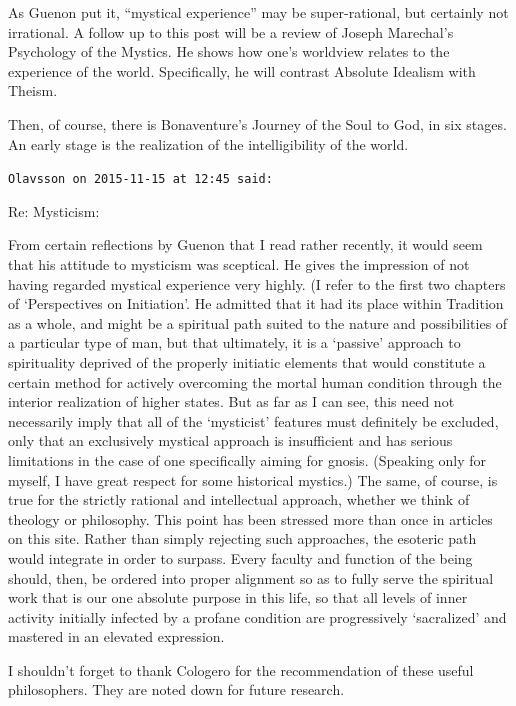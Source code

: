 \begin{footnotesize}
\begin{sffamily}
As Guenon put it, “mystical experience” may be super-rational, but certainly not irrational. A follow up to this post
will be a review of Joseph Marechal's Psychology of the Mystics. He shows how one's worldview
relates to the experience of the world. Specifically, he will contrast Absolute Idealism with Theism.

Then, of course, there is Bonaventure's Journey of the Soul to God, in six stages. An early stage is the
realization of the intelligibility of the world.


\hfill

\texttt{Olavsson on 2015-11-15 at 12:45 said: }

Re: Mysticism:

From certain reflections by Guenon that I read rather recently, it would seem that his attitude to mysticism was
sceptical. He gives the impression of not having regarded mystical experience very highly. (I refer to the first two
chapters of ‘Perspectives on Initiation’. He admitted that it had its place within Tradition
as a whole, and might be a spiritual path suited to the nature and possibilities of a particular type of man, but that
ultimately, it is a `passive' approach to spirituality deprived of the properly initiatic
elements that would constitute a certain method for actively overcoming the mortal human condition through the interior
realization of higher states. But as far as I can see, this need not necessarily imply that all of the
`mysticist' features must definitely be excluded, only that an exclusively mystical approach is
insufficient and has serious limitations in the case of one specifically aiming for gnosis. (Speaking only for myself,
I have great respect for some historical mystics.) The same, of course, is true for the strictly rational and
intellectual approach, whether we think of theology or philosophy. This point has been stressed more than once in
articles on this site. Rather than simply rejecting such approaches, the esoteric path would integrate in order to
surpass. Every faculty and function of the being should, then, be ordered into proper alignment so as to fully serve
the spiritual work that is our one absolute purpose in this life, so that all levels of inner activity initially
infected by a profane condition are progressively `sacralized' and mastered in an elevated
expression.

I shouldn't forget to thank Cologero for the recommendation of these useful philosophers. They are noted
down for future research. 


\end{sffamily}
\end{footnotesize}
